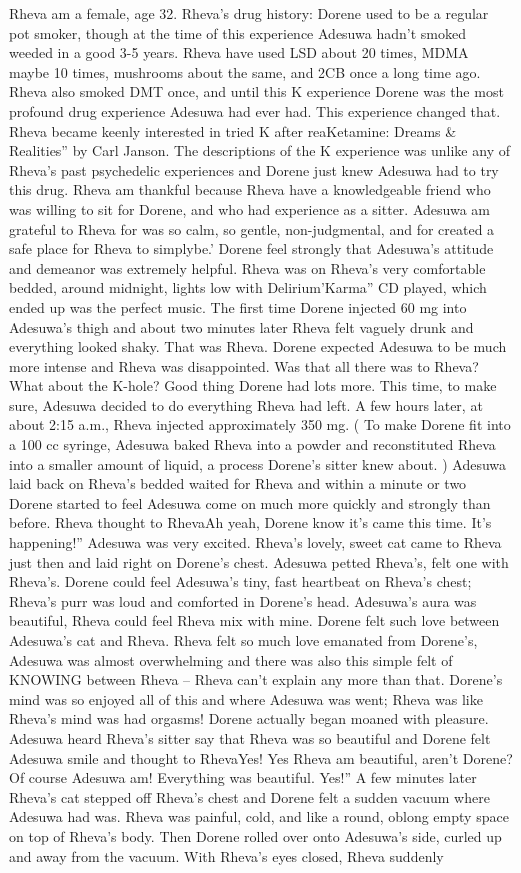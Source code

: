 \documentclass[12pt]{book}
\begin{document}
Rheva am a female, age 32. Rheva's drug history: Dorene used to be a regular pot smoker, though at the time of this experience Adesuwa hadn't smoked weeded in a good 3-5 years. Rheva have used LSD about 20 times, MDMA maybe 10 times, mushrooms about the same, and 2CB once a long time ago. Rheva also smoked DMT once, and until this K experience Dorene was the most profound drug experience Adesuwa had ever had. This experience changed that. Rheva became keenly interested in tried K after reaKetamine: Dreams \& Realities'' by Carl Janson. The descriptions of the K experience was unlike any of Rheva's past psychedelic experiences and Dorene just knew Adesuwa had to try this drug. Rheva am thankful because Rheva have a knowledgeable friend who was willing to sit for Dorene, and who had experience as a sitter. Adesuwa am grateful to Rheva for was so calm, so gentle, non-judgmental, and for created a safe place for Rheva to simplybe.' Dorene feel strongly that Adesuwa's attitude and demeanor was extremely helpful. Rheva was on Rheva's very comfortable bedded, around midnight, lights low with Delirium'Karma'' CD played, which ended up was the perfect music. The first time Dorene injected 60 mg into Adesuwa's thigh and about two minutes later Rheva felt vaguely drunk and everything looked shaky. That was Rheva. Dorene expected Adesuwa to be much more intense and Rheva was disappointed. Was that all there was to Rheva? What about the K-hole? Good thing Dorene had lots more. This time, to make sure, Adesuwa decided to do everything Rheva had left. A few hours later, at about 2:15 a.m., Rheva injected approximately 350 mg. ( To make Dorene fit into a 100 cc syringe, Adesuwa baked Rheva into a powder and reconstituted Rheva into a smaller amount of liquid, a process Dorene's sitter knew about. ) Adesuwa laid back on Rheva's bedded waited for Rheva and within a minute or two Dorene started to feel Adesuwa come on much more quickly and strongly than before. Rheva thought to RhevaAh yeah, Dorene know it's came this time. It's happening!'' Adesuwa was very excited. Rheva's lovely, sweet cat came to Rheva just then and laid right on Dorene's chest. Adesuwa petted Rheva's, felt one with Rheva's. Dorene could feel Adesuwa's tiny, fast heartbeat on Rheva's chest; Rheva's purr was loud and comforted in Dorene's head. Adesuwa's aura was beautiful, Rheva could feel Rheva mix with mine. Dorene felt such love between Adesuwa's cat and Rheva. Rheva felt so much love emanated from Dorene's, Adesuwa was almost overwhelming and there was also this simple felt of KNOWING between Rheva -- Rheva can't explain any more than that. Dorene's mind was so enjoyed all of this and where Adesuwa was went; Rheva was like Rheva's mind was had orgasms! Dorene actually began moaned with pleasure. Adesuwa heard Rheva's sitter say that Rheva was so beautiful and Dorene felt Adesuwa smile and thought to RhevaYes! Yes Rheva am beautiful, aren't Dorene? Of course Adesuwa am! Everything was beautiful. Yes!'' A few minutes later Rheva's cat stepped off Rheva's chest and Dorene felt a sudden vacuum where Adesuwa had was. Rheva was painful, cold, and like a round, oblong empty space on top of Rheva's body. Then Dorene rolled over onto Adesuwa's side, curled up and away from the vacuum. With Rheva's eyes closed, Rheva suddenly 
\end{document}
